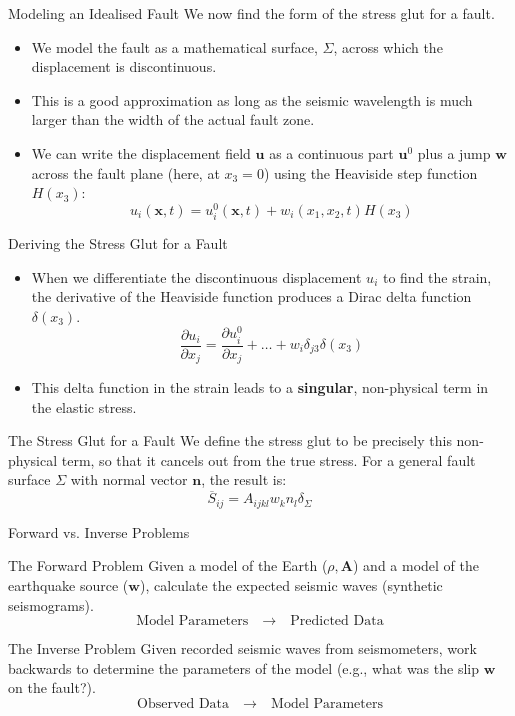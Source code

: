\documentclass{beamer}
\begin{document}
\begin{frame}{Modeling an Idealised Fault}
    We now find the form of the stress glut for a fault.
    \begin{itemize}
        \item We model the fault as a mathematical surface, $\Sigma$, across which the displacement is discontinuous.
        \pause
        \item This is a good approximation as long as the seismic wavelength is much larger than the width of the actual fault zone.
        \pause
        \item We can write the displacement field $\mathbf{u}$ as a continuous part $\mathbf{u}^0$ plus a jump $\mathbf{w}$ across the fault plane (here, at $x_3=0$) using the Heaviside step function $H(x_3)$:
        $$ u_{i}(\mathbf{x}, t) = u_{i}^{0}(\mathbf{x}, t) + w_{i}(x_1, x_2, t)H(x_3) $$
    \end{itemize}
\end{frame}

\begin{frame}{Deriving the Stress Glut for a Fault}
    \begin{itemize}
        \item When we differentiate the discontinuous displacement $u_i$ to find the strain, the derivative of the Heaviside function produces a Dirac delta function $\delta(x_3)$.
        $$ \frac{\partial u_{i}}{\partial x_{j}} = \frac{\partial u_{i}^{0}}{\partial x_{j}} + \dots + w_{i}\delta_{j3}\delta(x_3) $$
        \pause
        \item This delta function in the strain leads to a \textbf{singular}, non-physical term in the elastic stress.
    \end{itemize}
    \pause
    \begin{alertblock}{The Stress Glut for a Fault}
        We define the stress glut to be precisely this non-physical term, so that it cancels out from the true stress. For a general fault surface $\Sigma$ with normal vector $\mathbf{n}$, the result is:
        $$ \overline{S}_{ij} = A_{ijkl}w_{k}n_{l}\delta_{\Sigma} $$
    \end{alertblock}
\end{frame}


\begin{frame}{Forward vs. Inverse Problems}
    \begin{block}{The Forward Problem}
        Given a model of the Earth ($\rho, \mathbf{A}$) and a model of the earthquake source ($\mathbf{w}$), calculate the expected seismic waves (synthetic seismograms).
        $$ \text{Model Parameters} \quad \rightarrow \quad \text{Predicted Data} $$
    \end{block}
    \pause
    \begin{block}{The Inverse Problem}
        Given recorded seismic waves from seismometers, work backwards to determine the parameters of the model (e.g., what was the slip $\mathbf{w}$ on the fault?).
        $$ \text{Observed Data} \quad \rightarrow \quad \text{Model Parameters} $$
    \end{block}
\end{frame}
\end{document}
